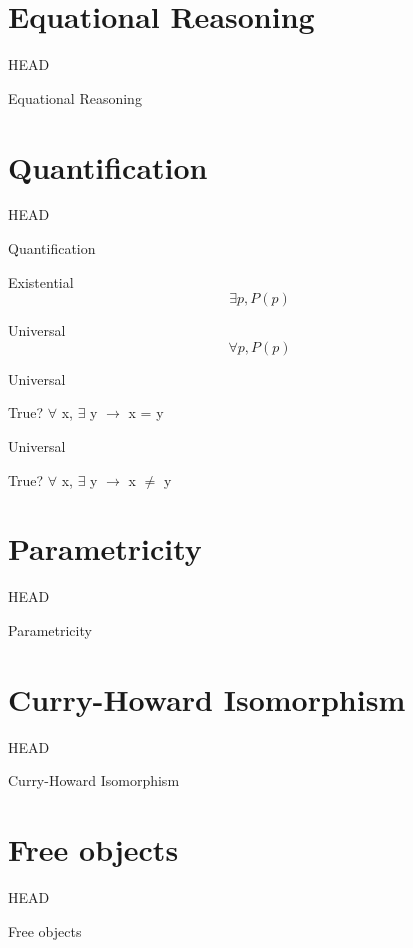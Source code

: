 \documentclass[utf8x,notes,17pt]{beamer}
\newcommand{\head}[1]{\begin{center}
\vspace{13mm}\hspace{-1mm}\Huge{{#1}}
\end{center}}
\begin{document}
\section{Equational Reasoning}
\label{sec-8}
\begin{frame}[fragile,plain,label=sec-8-1]{HEAD}
\head{Equational Reasoning}
\end{frame}
\section{Quantification}
\label{sec-9}
\begin{frame}[fragile,plain,label=sec-9-1]{HEAD}
\head{Quantification}
\end{frame}
\begin{frame}[fragile,label=sec-9-2]{Existential}
\[ \exists p, P(p) \]
\end{frame}
\begin{frame}[fragile,label=sec-9-3]{Universal}
\[ \forall p, P(p) \]
\end{frame}
\begin{frame}[fragile,label=sec-9-4]{Universal}
\begin{alertblock}{True?}%
$\forall$ x, $\exists$ y $\rightarrow$ x = y
\end{alertblock}
\end{frame}
\begin{frame}[fragile,label=sec-9-5]{Universal}
\begin{alertblock}{True?}%
$\forall$ x, $\exists$ y $\rightarrow$ x $\neq$ y
\end{alertblock}
\end{frame}
\section{Parametricity}
\label{sec-10}
\begin{frame}[fragile,plain,label=sec-10-1]{HEAD}
\head{Parametricity}
\end{frame}
\section{Curry-Howard Isomorphism}
\label{sec-11}
\begin{frame}[fragile,plain,label=sec-11-1]{HEAD}
\head{Curry-Howard Isomorphism}
\end{frame}
\section{Free objects}
\label{sec-12}
\begin{frame}[fragile,plain,label=sec-12-1]{HEAD}
\head{Free objects}
\end{frame}
\end{document}
